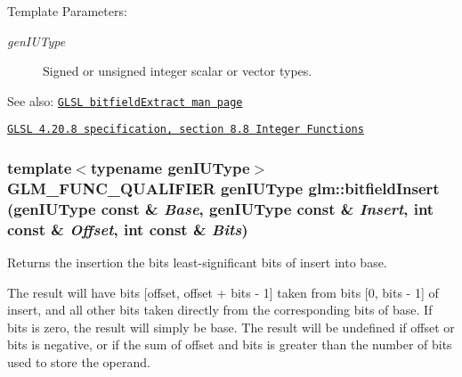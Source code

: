 \begin{Desc}
\item[Template Parameters:]
\begin{description}
\item[{\em genIUType}]Signed or unsigned integer scalar or vector types.\end{description}
\end{Desc}
\begin{Desc}
\item[See also:]\href{http://www.opengl.org/sdk/docs/manglsl/xhtml/bitfieldExtract.xml}{\tt GLSL bitfieldExtract man page} 

\href{http://www.opengl.org/registry/doc/GLSLangSpec.4.20.8.pdf}{\tt GLSL 4.20.8 specification, section 8.8 Integer Functions} \end{Desc}
\hypertarget{group__core__func__integer_g33b112990d40ef4c8bf91591dc7d9cd9}{
\subsubsection[bitfieldInsert]{\setlength{\rightskip}{0pt plus 5cm}template$<$typename genIUType$>$ GLM\_\-FUNC\_\-QUALIFIER genIUType glm::bitfieldInsert (genIUType const \& {\em Base}, \/  genIUType const \& {\em Insert}, \/  int const \& {\em Offset}, \/  int const \& {\em Bits})}}
\label{group__core__func__integer_g33b112990d40ef4c8bf91591dc7d9cd9}


Returns the insertion the bits least-significant bits of insert into base.

The result will have bits \mbox{[}offset, offset + bits - 1\mbox{]} taken from bits \mbox{[}0, bits - 1\mbox{]} of insert, and all other bits taken directly from the corresponding bits of base. If bits is zero, the result will simply be base. The result will be undefined if offset or bits is negative, or if the sum of offset and bits is greater than the number of bits used to store the operand.

